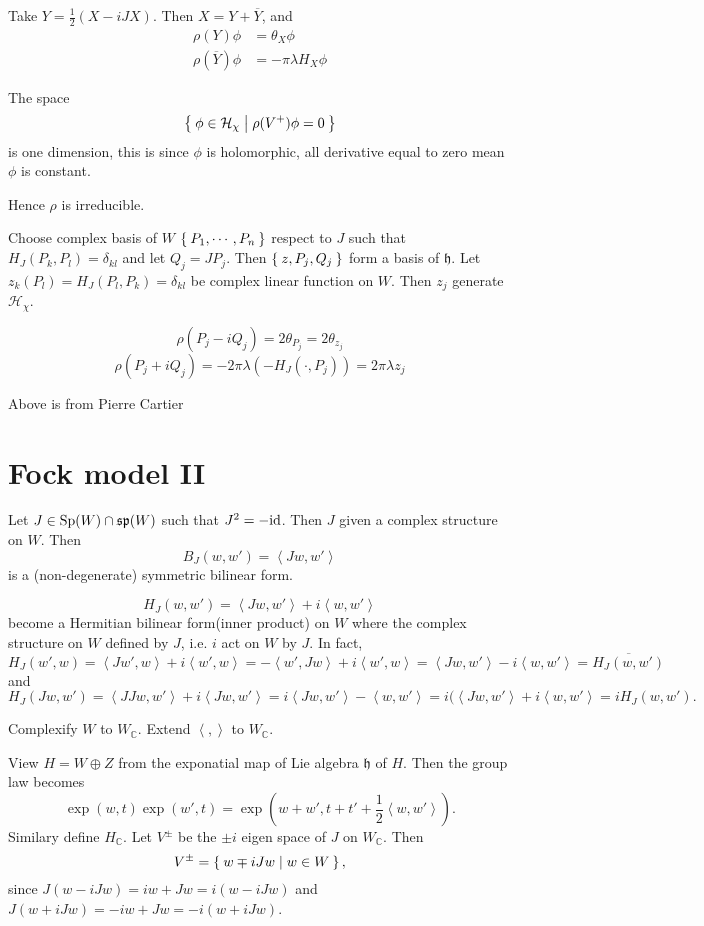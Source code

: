 \documentclass[12pt]{amsart}
\def\bC{{\mathbb{C}}}
\def\sp{{\mathfrak{sp}}}
\def\id{{\rm id}}
\def\inn#1#2{\left\langle{#1},{#2}\right\rangle}
\def\Sp{{\rm Sp}}
\def\fhh{\mathfrak{h}}
\def\chh{\mathcal{H}}
\begin{document}
Take $Y = \frac{1}{2}(X-iJX)$. Then $X = Y + \overline{Y}$, 
and 
\begin{align*}
\rho(Y) \phi &= \theta_X \phi \\
\rho(\overline{Y}) \phi &= -\pi \lambda H_X \phi
\end{align*}

The space 
\[
\Set{\phi \in \chh_\chi |\rho(V^+) \phi = 0}
\]
is one dimension, this is since $\phi$ is holomorphic, 
all derivative equal to zero mean $\phi$ is constant. 

Hence $\rho$ is irreducible. 

Choose complex basis of $W$ $\Set{P_1, \cdots, P_n}$
respect to $J$ such that
$H_J(P_k, P_l) = \delta_{kl}$ and let $Q_j = J P_j$. 
Then $\Set{z, P_j, Q_j}$ form a basis of $\fhh$. 
Let $z_k(P_l) = H_J(P_l, P_k) =\delta_{kl}$ be complex linear function on 
$W$. Then $z_j$ generate $\chh_\chi$. 

\[
\rho(P_j-iQ_j) = 2 \theta_{P_j} =  2\theta_{z_j}
\]
\[
\rho(P_j+iQ_j) = -2\pi\lambda (-H_J(\cdot,P_j)) 
 = 2\pi \lambda z_j
\]

Above is from Pierre Cartier 

\section{Fock model II}
Let $J\in \Sp(W)\cap \sp(W)$ such that $J^2 = -\id$.
Then $J$ given a complex structure on $W$.
Then 
\[
B_J(w,w') = \inn{Jw}{w'}
\]
is a (non-degenerate) symmetric bilinear form.

\[
H_J(w,w') = \inn{Jw}{w'} + i\inn{w}{w'}
\]
become a Hermitian bilinear form(inner product) on $W$ where the 
complex structure on $W$ defined by $J$, i.e. $i$ act on $W$ by $J$. 
In fact,
\[
H_J(w',w) = \inn{Jw'}{w} + i \inn{w'}{w} = -\inn{w'}{Jw} + i\inn{w'}{w}
= \inn{Jw}{w'} - i \inn{w}{w'}= \overline{H_J(w,w')}
\]
and
\[
H_J(Jw,w') = \inn{JJw}{w'} + i\inn{Jw}{w'} = i\inn{Jw}{w'} - \inn{w}{w'} 
= i(\inn{Jw}{w'} + i\inn{w}{w'} = i H_J(w,w').
\]

Complexify $W$ to $W_\bC$. Extend $\inn{}{}$ to $W_\bC$.  
 
View $H = W\oplus Z$ from the exponatial map of Lie algebra $\fhh$ of $H$. 
Then the group law becomes
\[
\exp(w, t) \exp(w',t) = \exp(w+w', t+t'+\frac{1}{2}\inn{w}{w'}).
\]
Similary define $H_\bC$. 
Let $V^\pm$ be the $\pm i$ eigen space of $J$ on $W_\bC$. 
Then 
\[
V^\pm = \Set{w \mp iJw | w\in W },
\] 
since $J(w - iJw) = iw+Jw = i(w-iJw)$ and
$J(w+iJw) = -iw + Jw = -i(w+iJw)$.
\end{document}
